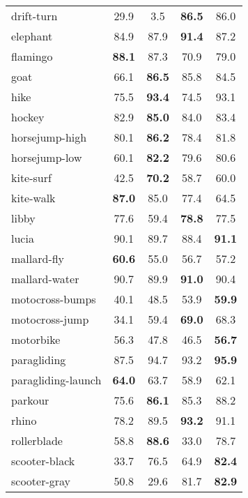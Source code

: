 \documentclass[10pt,twocolumn,letterpaper]{article}
\begin{document}
\begin{table}
\begin{centering}
\begin{tabular}{l|@{   }c@{   }c@{   }c@{   }c@{    }}
drift-turn          &     29.9    &     3.5     & \bf 86.5  &		86.0 \\
elephant            &     84.9    &     87.9    & \bf 91.4  &		87.2 \\
flamingo            & \bf 88.1    &     87.3    &     70.9  &		79.0 \\
goat                &     66.1    & \bf 86.5    &     85.8  &		84.5 \\
hike                &     75.5    & \bf 93.4    &     74.5  &		93.1 \\
hockey              &     82.9    & \bf 85.0    &     84.0  &		83.4 \\
horsejump-high      &     80.1    & \bf 86.2    &     78.4  &		81.8 \\
horsejump-low       &     60.1    & \bf 82.2    &     79.6  &		80.6 \\
kite-surf           &     42.5    & \bf 70.2    &     58.7  &		60.0 \\
kite-walk           & \bf 87.0    &     85.0    &     77.4  &		64.5 \\
libby               &     77.6    &     59.4    & \bf 78.8  &		77.5 \\
lucia               &  90.1    &     89.7    &     88.4  &	\bf 	91.1 \\
mallard-fly         & \bf 60.6    &     55.0    &     56.7  &		57.2 \\
mallard-water       &     90.7    &     89.9    & \bf 91.0  &		90.4 \\
motocross-bumps     &     40.1    &     48.5    &  53.9  &	\bf 	59.9 \\
motocross-jump      &     34.1    &     59.4    & \bf 69.0  &		68.3 \\
motorbike           &  56.3    &     47.8    &     46.5  &	\bf 	56.7 \\
paragliding         &     87.5    &  94.7    &     93.2  &	\bf 	95.9 \\
paragliding-launch  & \bf 64.0    &     63.7    &     58.9  &		62.1 \\
parkour             &     75.6    & \bf 86.1    &     85.3  &		88.2 \\
rhino               &     78.2    &     89.5    & \bf 93.2  &		91.1 \\
rollerblade         &     58.8    & \bf 88.6    &     33.0  &		78.7 \\
scooter-black       &     33.7    &  76.5    &     64.9  &	\bf 	82.4 \\
scooter-gray        &     50.8    &     29.6    &  81.7  &	\bf 	82.9 \\

\end{tabular}
\end{centering}
\end{table}
\end{document}

